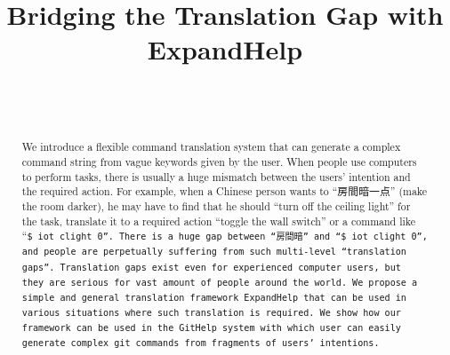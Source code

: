 \documentclass{sigchi}
\def\plaintitle{Bridging the Translation Gap with ExpandHelp}
\def\GH{\textsf{GitHelp}}
\def\EH{\textsf{ExpandHelp}}
\def\GIT{\texttt{git}}
\begin{document}
\title{\plaintitle}

\author{%
  \\
  \\
}

\maketitle

\begin{abstract}
  We introduce a flexible command translation system that can generate
  a complex command string from vague keywords
  given by the user.
  When people use computers to perform tasks,
  there is usually a huge mismatch between the users' intention
  and the required action.
  For example, when a Chinese person wants to ``房間暗一点'' (make the room darker),
  he may have to find that he should ``turn off the ceiling light'' for the task,
  translate it to a required action ``toggle the wall switch''
  or a command like ``\tt{\$ iot clight 0}''.
  There is a huge gap between ``房間暗'' and ``\tt{\$ iot clight 0}'', and
  people are perpetually suffering from such multi-level ``\textit{translation gaps}''.
  Translation gaps exist even for experienced computer users, but
  they are serious for vast amount of people around the world.
  We propose a simple and general translation framework
  {\EH} that can be used in various situations
  where such translation is required.
  We show how our framework can be used
  in the {\GH} system
  with which user can easily generate complex {\GIT} commands
  from fragments of users' intentions.
\end{abstract}
\end{document}
